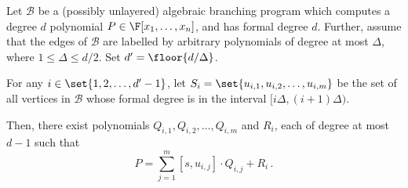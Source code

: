 \begin{lemma}[\cite{K19}]\label{lem:structure}
	Let $\mathcal{B}$ be a (possibly unlayered) algebraic branching program which computes a degree $d$ polynomial $P\in\F[x_1,\ldots,x_n]$, and has formal degree $d$. Further, assume that the edges of $\mathcal{B}$ are labelled by arbitrary polynomials of degree at most $\Delta$, where $1\le\Delta\le d/2$. Set $d'=\floor{d/\Delta}$.
		
	 For any $i \in \set{1, 2, \ldots ,d'-1}$, let $S_i = \set{u_{i,1}, u_{i,2}, \ldots, u_{i,m}}$ be the set of all vertices in $\mathcal{B}$ whose formal degree is in the interval $[i \Delta, (i+1)\Delta)$.
	 
	 Then, there exist polynomials $Q_{i,1}, Q_{i,2}, \ldots, Q_{i,m}$ and $R_i$, each of degree at most $d-1$ such that
		\[P = \sum_{j=1}^{m} [s, u_{i,j}] \cdot Q_{i,j} + R_i\, .\]
\end{lemma}

